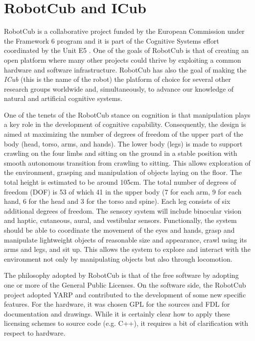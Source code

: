 
\section{RobotCub and ICub}
RobotCub is a collaborative project funded by the European Commission under 
the Framework 6 program and it is part of the Cognitive Systems effort 
coordinated by the Unit E5 \cite{}. %
One of the goals of RobotCub is that of creating an open platform where
many other projects could thrive by exploiting a common hardware and software
infrastructure. RobotCub has also the goal of making the {\em ICub} (this is 
the name of the robot) the platform of choice for several other research
groups worldwide and, simultaneously, to advance our knowledge of natural and
artificial cognitive systems.

One of the tenets of the RobotCub stance on cognition is that manipulation 
plays a key role in the development of cognitive capability. Consequently, 
the design is aimed at maximizing the number of degrees of freedom of the upper 
part of the body (head, torso, arms, and hands). The lower body (legs) is made 
to support crawling on the four limbs and sitting on the ground in a stable 
position with smooth autonomous transition from crawling to sitting. This  
allows exploration of the environment, grasping and manipulation of objects 
laying on the floor. The total height is estimated to be around 105cm. The 
total number of degrees of freedom (DOF) is 53 of which 41 in the upper body 
(7 for each arm, 9 for each hand, 6 for the head and 3 for the torso and spine). 
Each leg consists of six additional degrees of freedom. The sensory system will 
include binocular vision and haptic, cutaneous, aural, and vestibular sensors. 
Functionally, the system should be able to coordinate the movement of the eyes 
and hands, grasp and manipulate lightweight objects of reasonable size and 
appearance, crawl using its arms and legs, and sit up. This allows the system 
to explore and interact with the environment not only by manipulating objects 
but also through locomotion.

The philosophy adopted by RobotCub is that of
the free software by adopting one or more of the General Public Licenses. 
On the software side, the RobotCub project adopted YARP and contributed
to the development of some new specific features. For the hardware, it 
was chosen GPL for the sources and FDL for documentation
and drawings. While it is certainly clear how to apply these licensing
schemes to source code (e.g. C++), it requires a bit of clarification 
with respect to hardware. 

